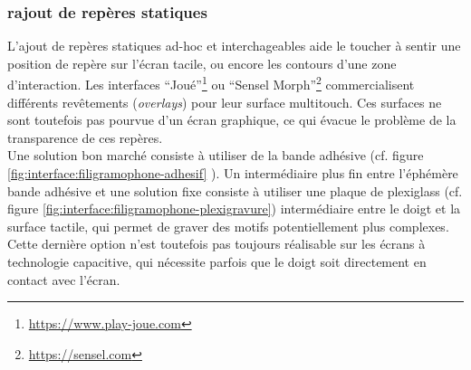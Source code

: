 \subsubsection{rajout de repères statiques}
L'ajout de repères statiques ad-hoc et interchageables aide le toucher à sentir une position de repère sur l'écran tacile, ou encore les contours d'une zone d'interaction. Les interfaces ``Joué''\footnote{\url{https://www.play-joue.com}} ou ``Sensel Morph''\footnote{\url{https://sensel.com}} commercialisent différents revêtements (\textit{overlays}) pour leur surface multitouch. Ces surfaces ne sont toutefois pas pourvue d'un écran graphique, ce qui évacue le problème de la transparence de ces repères.\\
Une solution bon marché consiste à utiliser de la bande adhésive (cf. figure \ref{fig:interface:filigramophone-adhesif}
). Un intermédiaire plus fin entre l'éphémère bande adhésive et une solution fixe consiste à utiliser une plaque de plexiglass (cf. figure \ref{fig:interface:filigramophone-plexigravure}) intermédiaire entre le doigt et la surface tactile, qui permet de graver des motifs potentiellement plus complexes. Cette dernière option n'est toutefois pas toujours réalisable sur les écrans à technologie capacitive, qui nécessite parfois que le doigt soit directement en contact avec l'écran.\\

